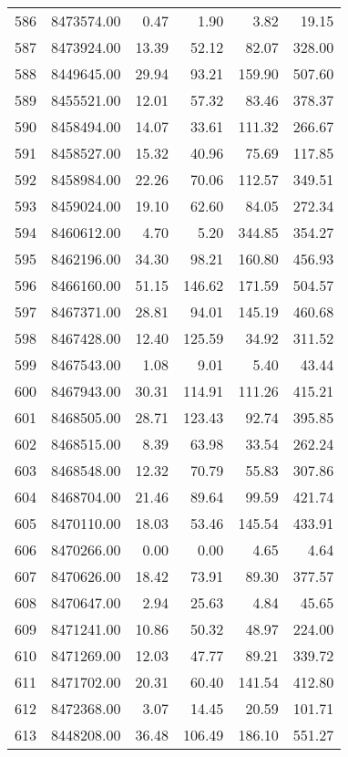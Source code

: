 \begin{table}[ht]
\begin{tabular}{rrrrrr}
  586 & 8473574.00 & 0.47 & 1.90 & 3.82 & 19.15 \\ 
  587 & 8473924.00 & 13.39 & 52.12 & 82.07 & 328.00 \\ 
  588 & 8449645.00 & 29.94 & 93.21 & 159.90 & 507.60 \\ 
  589 & 8455521.00 & 12.01 & 57.32 & 83.46 & 378.37 \\ 
  590 & 8458494.00 & 14.07 & 33.61 & 111.32 & 266.67 \\ 
  591 & 8458527.00 & 15.32 & 40.96 & 75.69 & 117.85 \\ 
  592 & 8458984.00 & 22.26 & 70.06 & 112.57 & 349.51 \\ 
  593 & 8459024.00 & 19.10 & 62.60 & 84.05 & 272.34 \\ 
  594 & 8460612.00 & 4.70 & 5.20 & 344.85 & 354.27 \\ 
  595 & 8462196.00 & 34.30 & 98.21 & 160.80 & 456.93 \\ 
  596 & 8466160.00 & 51.15 & 146.62 & 171.59 & 504.57 \\ 
  597 & 8467371.00 & 28.81 & 94.01 & 145.19 & 460.68 \\ 
  598 & 8467428.00 & 12.40 & 125.59 & 34.92 & 311.52 \\ 
  599 & 8467543.00 & 1.08 & 9.01 & 5.40 & 43.44 \\ 
  600 & 8467943.00 & 30.31 & 114.91 & 111.26 & 415.21 \\ 
  601 & 8468505.00 & 28.71 & 123.43 & 92.74 & 395.85 \\ 
  602 & 8468515.00 & 8.39 & 63.98 & 33.54 & 262.24 \\ 
  603 & 8468548.00 & 12.32 & 70.79 & 55.83 & 307.86 \\ 
  604 & 8468704.00 & 21.46 & 89.64 & 99.59 & 421.74 \\ 
  605 & 8470110.00 & 18.03 & 53.46 & 145.54 & 433.91 \\ 
  606 & 8470266.00 & 0.00 & 0.00 & 4.65 & 4.64 \\ 
  607 & 8470626.00 & 18.42 & 73.91 & 89.30 & 377.57 \\ 
  608 & 8470647.00 & 2.94 & 25.63 & 4.84 & 45.65 \\ 
  609 & 8471241.00 & 10.86 & 50.32 & 48.97 & 224.00 \\ 
  610 & 8471269.00 & 12.03 & 47.77 & 89.21 & 339.72 \\ 
  611 & 8471702.00 & 20.31 & 60.40 & 141.54 & 412.80 \\ 
  612 & 8472368.00 & 3.07 & 14.45 & 20.59 & 101.71 \\ 
  613 & 8448208.00 & 36.48 & 106.49 & 186.10 & 551.27 \\ 

\end{tabular}
\end{table}
